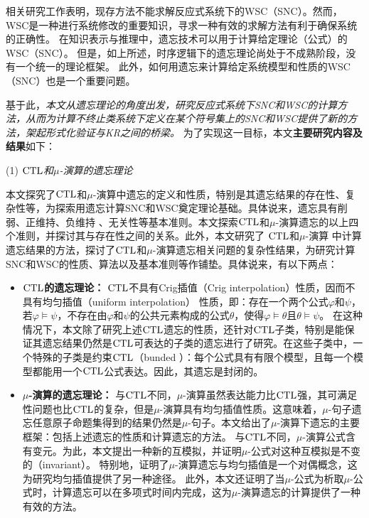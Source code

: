相关研究工作表明，现存方法不能求解反应式系统下的WSC（SNC）。然而，WSC是一种进行系统修改的重要知识，寻求一种有效的求解方法有利于确保系统的正确性。
在知识表示与推理中，遗忘技术可以用于计算给定理论（公式）的WSC（SNC）。
但是，如上所述，时序逻辑下的遗忘理论尚处于不成熟阶段，没有一个统一的理论框架。
此外，如何用遗忘来计算给定系统模型和性质的WSC（SNC）也是一个重要问题。

基于此，{\em 本文从遗忘理论的角度出发，研究反应式系统下SNC和WSC的计算方法，从而为计算不终止类系统下定义在某个符号集上的SNC和WSC提供了新的方法，架起形式化验证与KR之间的桥梁。}
为了实现这一目标，本文\textbf{主要研究内容及结果}如下：

(1) {\em $\textrm{CTL}$和$\mu$-演算的遗忘理论}

本文探究了$\textrm{CTL}$和$\mu$-演算中遗忘的定义和性质，特别是其遗忘结果的存在性、复杂性等，为探索用遗忘计算SNC和WSC奠定理论基础。具体说来，遗忘具有削弱、正维持、负维持 、无关性等基本准则\cite{Yan:AIJ:2009}。本文探索$\textrm{CTL}$和$\mu$-演算遗忘的以上四个准则，并探讨其与存在性之间的关系。此外，本文研究了 $\textrm{CTL}$和$\mu$-演算 中计算遗忘结果的方法，探讨了$\textrm{CTL}$和$\mu$-演算遗忘相关问题的复杂性结果，为研究计算SNC和WSC的性质、算法以及基本准则等作铺垫。具体说来，有以下两点：
\begin{itemize}
	\item \textbf{$\textrm{CTL}$的遗忘理论：}
	$\textrm{CTL}$不具有Crig插值（Crig interpolation）性质，因而不具有均匀插值（uniform interpolation） 性质\cite{Maksimova:JANCL:1991}，即：存在一个两个公式$\varphi$和$\psi$，若$\varphi \models \psi$，不存在由$\varphi$和$\psi$的公共元素构成的公式$\theta$，使得$\varphi \models \theta$且$\theta \models \psi$。
	在这种情况下，本文除了研究上述$\textrm{CTL}$遗忘的性质，还针对$\textrm{CTL}$子类，特别是能保证其遗忘结果仍然是$\textrm{CTL}$可表达的子类的遗忘进行了研究。在这些子类中，一个特殊的子类是约束$\textrm{CTL}$（bunded \CTL）：每个公式具有有限个模型，且每一个模型都能用一个$\textrm{CTL}$公式表达。因此，其遗忘是封闭的。
	
	\item \textbf{$\mu$-演算的遗忘理论：}
	与$\textrm{CTL}$不同，$\mu$-演算虽然表达能力比$\textrm{CTL}$强，其可满足性问题也比$\textrm{CTL}$的复杂，但是$\mu$-演算具有均匀插值性质\cite{d2006modal}。这意味着，$\mu$-句子遗忘任意原子命题集得到的结果仍然是$\mu$-句子。本文给出了$\mu$-演算下遗忘的主要框架：包括上述遗忘的性质和计算遗忘的方法。
	与$\textrm{CTL}$不同，$\mu$-演算公式含有变元。为此，本文提出一种新的互模拟，并证明$\mu$-公式对这种互模拟是不变的（invariant）。
	特别地，证明了$\mu$-演算遗忘与均匀插值是一个对偶概念，这为研究均匀插值提供了另一种途径。
	此外，本文还证明了当$\mu$-公式为析取$\mu$-公式时，计算遗忘可以在多项式时间内完成，这为$\mu$-演算遗忘的计算提供了一种有效的方法。
\end{itemize}


